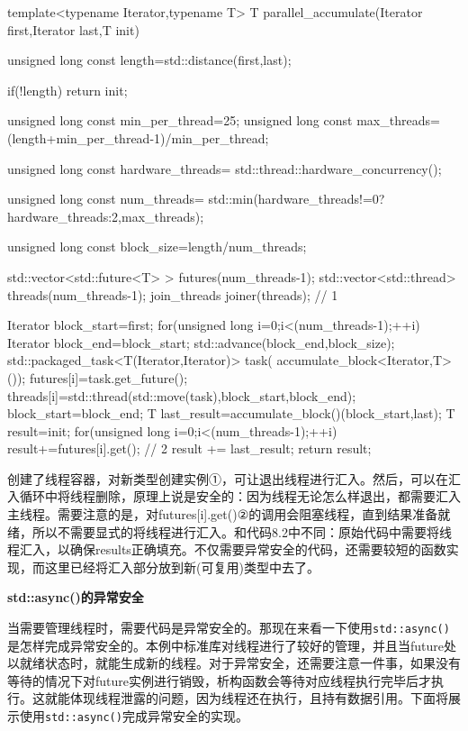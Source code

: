 \begin{cpp}
template<typename Iterator,typename T>
T parallel_accumulate(Iterator first,Iterator last,T init)
{
  unsigned long const length=std::distance(first,last);

  if(!length)
    return init;

  unsigned long const min_per_thread=25;
  unsigned long const max_threads=
    (length+min_per_thread-1)/min_per_thread;

  unsigned long const hardware_threads=
    std::thread::hardware_concurrency();

  unsigned long const num_threads=
    std::min(hardware_threads!=0?hardware_threads:2,max_threads);

  unsigned long const block_size=length/num_threads;

  std::vector<std::future<T> > futures(num_threads-1);
  std::vector<std::thread> threads(num_threads-1);
  join_threads joiner(threads);  // 1

  Iterator block_start=first;
  for(unsigned long i=0;i<(num_threads-1);++i)
  {
    Iterator block_end=block_start;
    std::advance(block_end,block_size);
    std::packaged_task<T(Iterator,Iterator)> task(
      accumulate_block<Iterator,T>());
    futures[i]=task.get_future();
    threads[i]=std::thread(std::move(task),block_start,block_end);
    block_start=block_end;
  }
  T last_result=accumulate_block()(block_start,last);
  T result=init;
  for(unsigned long i=0;i<(num_threads-1);++i)
  {
    result+=futures[i].get();  // 2
  }
  result += last_result;
  return result;
}
\end{cpp}

创建了线程容器，对新类型创建实例①，可让退出线程进行汇入。然后，可以在汇入循环中将线程删除，原理上说是安全的：因为线程无论怎么样退出，都需要汇入主线程。需要注意的是，对futures[i].get()②的调用会阻塞线程，直到结果准备就绪，所以不需要显式的将线程进行汇入。和代码8.2中不同：原始代码中需要将线程汇入，以确保results正确填充。不仅需要异常安全的代码，还需要较短的函数实现，而这里已经将汇入部分放到新(可复用)类型中去了。

\textbf{std::async()的异常安全}

当需要管理线程时，需要代码是异常安全的。那现在来看一下使用\texttt{std::async()}是怎样完成异常安全的。本例中标准库对线程进行了较好的管理，并且当future处以就绪状态时，就能生成新的线程。对于异常安全，还需要注意一件事，如果没有等待的情况下对future实例进行销毁，析构函数会等待对应线程执行完毕后才执行。这就能体现线程泄露的问题，因为线程还在执行，且持有数据引用。下面将展示使用\texttt{std::async()}完成异常安全的实现。

